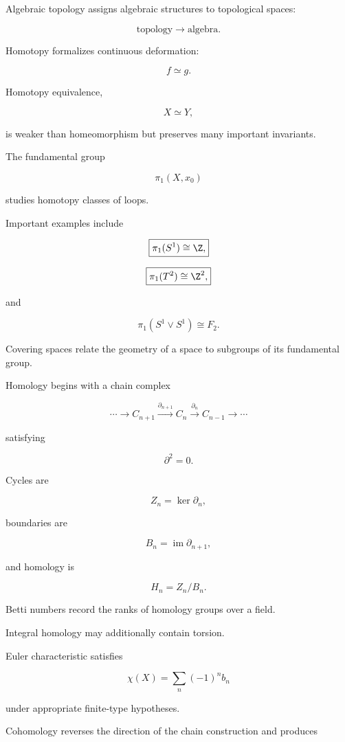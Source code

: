 Algebraic topology assigns algebraic structures to topological spaces:

\[
\boxed{
\text{topology}
\longrightarrow
\text{algebra}.
}
\]

Homotopy formalizes continuous deformation:

\[
\boxed{
f\simeq g.
}
\]

Homotopy equivalence,

\[
\boxed{
X\simeq Y,
}
\]

is weaker than homeomorphism but preserves many important invariants.

The fundamental group

\[
\boxed{
\pi_1(X,x_0)
}
\]

studies homotopy classes of loops.

Important examples include

\[
\boxed{
\pi_1(S^1)\cong\Z,
}
\]

\[
\boxed{
\pi_1(T^2)\cong\Z^2,
}
\]

and

\[
\boxed{
\pi_1(S^1\vee S^1)\cong F_2.
}
\]

Covering spaces relate the geometry of a space to subgroups of its
fundamental group.

Homology begins with a chain complex

\[
\boxed{
\cdots
\to
C_{n+1}
\xrightarrow{\partial_{n+1}}
C_n
\xrightarrow{\partial_n}
C_{n-1}
\to
\cdots
}
\]

satisfying

\[
\boxed{
\partial^2=0.
}
\]

Cycles are

\[
\boxed{
Z_n=\ker\partial_n,
}
\]

boundaries are

\[
\boxed{
B_n=\operatorname{im}\partial_{n+1},
}
\]

and homology is

\[
\boxed{
H_n
=
Z_n/B_n.
}
\]

Betti numbers record the ranks of homology groups over a field.

Integral homology may additionally contain torsion.

Euler characteristic satisfies

\[
\boxed{
\chi(X)
=
\sum_n(-1)^n b_n
}
\]

under appropriate finite-type hypotheses.

Cohomology reverses the direction of the chain construction and produces

